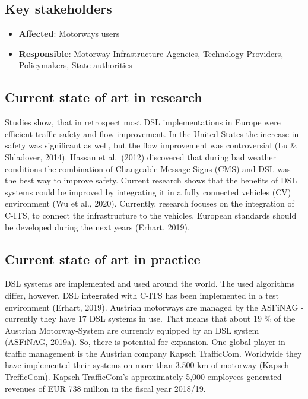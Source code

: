 \documentclass[
]{book}
\providecommand{\tightlist}{%
  \setlength{\itemsep}{0pt}\setlength{\parskip}{0pt}}
\begin{document}
\hypertarget{key-stakeholders-3}{%
\subsection*{Key stakeholders}\label{key-stakeholders-3}}

\begin{itemize}
\tightlist
\item
  \textbf{Affected}: Motorways users
\item
  \textbf{Responsible}: Motorway Infrastructure Agencies, Technology Providers, Policymakers, State authorities
\end{itemize}

\hypertarget{current-state-of-art-in-research-3}{%
\subsection*{Current state of art in research}\label{current-state-of-art-in-research-3}}

Studies show, that in retrospect most DSL implementations in Europe were efficient traffic safety and flow improvement. In the United States the increase in safety was significant as well, but the flow improvement was controversial (Lu \& Shladover, 2014). Hassan et al.~(2012) discovered that during bad weather conditions the combination of Changeable Message Signs (CMS) and DSL was the best way to improve safety. Current research shows that the benefits of DSL systems could be improved by integrating it in a fully connected vehicles (CV) environment (Wu et al., 2020). Currently, research focuses on the integration of C-ITS, to connect the infrastructure to the vehicles. European standards should be developed during the next years (Erhart, 2019).

\hypertarget{current-state-of-art-in-practice-3}{%
\subsection*{Current state of art in practice}\label{current-state-of-art-in-practice-3}}

DSL systems are implemented and used around the world. The used algorithms differ, however. DSL integrated with C-ITS has been implemented in a test environment (Erhart, 2019).
Austrian motorways are managed by the ASFiNAG - currently they have 17 DSL systems in use. That means that about 19 \% of the Austrian Motorway-System are currently equipped by an DSL system (ASFiNAG, 2019a). So, there is potential for expansion. One global player in traffic management is the Austrian company Kapsch TrafficCom. Worldwide they have implemented their systems on more than 3.500 km of motorway (Kapsch TrefficCom). Kapsch TrafficCom's approximately 5,000 employees generated revenues of EUR 738 million in the fiscal year 2018/19.
\end{document}
